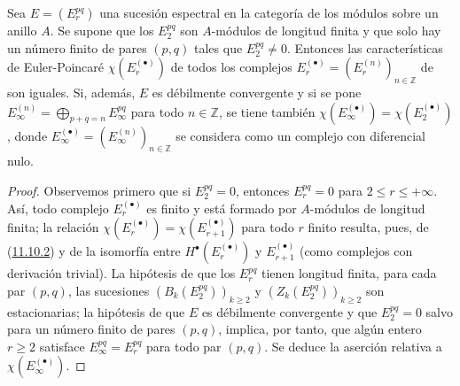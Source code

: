 \begin{corollary}[11.10.3]
\label{0.11.10.3}
\label{0.11.10.3-fr}
Sea $E=(E_r^{pq})$ una sucesión espectral en la
categoría de los módulos sobre un anillo $A$.
Se supone que los $E_2^{pq}$ son $A$-módulos de longitud finita y que solo hay un número finito de pares $(p,q)$ tales que $E_2^{pq}\neq0$. Entonces las características de Euler-Poincaré
$\chi(E_r^{(\bullet)})$
de todos los complejos
$E_r^{(\bullet)}=(E_r^{(n)})_{n\in\mathbb Z}$
de  son iguales.
Si, además, $E$ es débilmente convergente y si se pone $E_\infty^{(n)}=\bigoplus_{p+q=n}E_\infty^{pq}$ para todo $n\in\mathbb Z$, se tiene también $\chi(E_\infty^{(\bullet)})=\chi(E_2^{(\bullet)})$,
donde
$E_\infty^{(\bullet)}=(E_\infty^{(n)})_{n\in\mathbb Z}$
se considera como un complejo con diferencial nulo.
\end{corollary}

\begin{proof}
Observemos primero que si $E_2^{pq}=0$, entonces
$E_r^{pq}=0$ para $2\leq r\leq+\infty$.
Así, todo complejo $E_r^{(\bullet)}$ es finito y está formado por
$A$-módulos de longitud finita; la relación $\chi(E_r^{(\bullet)})=\chi(E_{r+1}^{(\bullet)})$ para todo $r$ finito resulta, pues, de (\hyperref[0.11.10.2-fr]{11.10.2}) y de la isomorfía entre $H^\bullet(E_r^{(\bullet)})$ y $E_{r+1}^{(\bullet)}$ (como complejos con derivación trivial). La hipótesis de que los $E_r^{pq}$ tienen longitud finita, para cada par
$(p,q)$, las sucesiones $(B_k(E_2^{pq}))_{k\geq2}$ y $(Z_k(E_2^{pq}))_{k\geq2}$ son estacionarias; la hipótesis de que $E$ es débilmente convergente y que $E_2^{pq}=0$ salvo para un número finito de pares $(p,q)$, implica, por tanto,
que algún entero $r\geq2$ satisface
$E_\infty^{pq}=E_r^{pq}$
para todo par $(p,q)$.
Se deduce la aserción relativa a
$\chi(E_\infty^{(\bullet)})$.
\end{proof}
